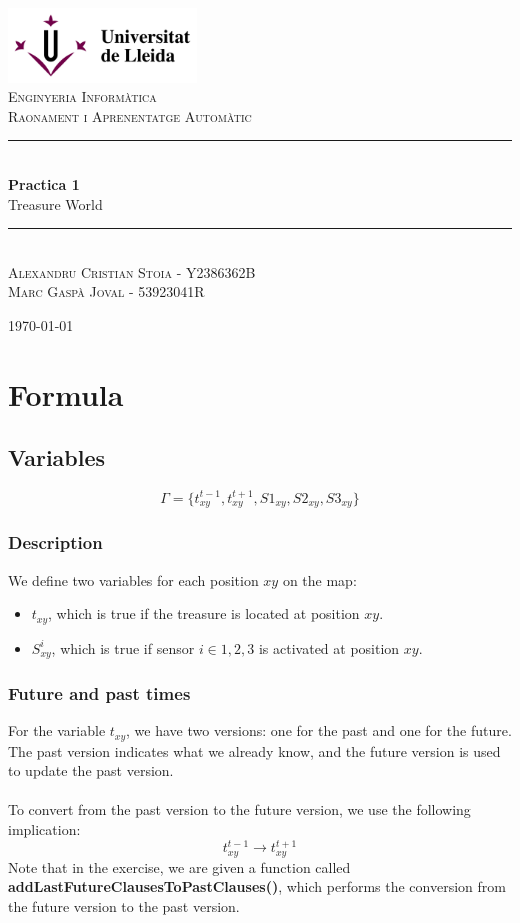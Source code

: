 \documentclass[12pt]{article}
\begin{document}
\begin{titlepage}
	\newcommand{\HRule}{\rule{\linewidth}{0.5mm}}

	\center

	\includegraphics[width=5cm]{logoudl.png}\\
	\textsc{\Large Enginyeria Informàtica}\\[0.5cm]
	\textsc{\large Raonament i Aprenentatge Automàtic}\\[0.5cm]

	\HRule\\[0.4cm]

	{\huge\bfseries Practica 1}\\[0.4cm]
	{\LARGE Treasure World}
	\HRule\\[1.5cm]

	\textsc{Alexandru Cristian Stoia - Y2386362B\\
		Marc Gaspà Joval - 53923041R}

	\vfill\vfill\vfill
	{\large\today}
\end{titlepage}
\pagebreak

\section{Formula}
\subsection{Variables}
$$ \Gamma = \{ t_{xy}^{t-1}, t_{xy}^{t+1}, S1_{xy}, S2_{xy}, S3_{xy}   \} $$

\subsubsection{Description}
We define two variables for each position $xy$ on the map:
\begin{itemize}[label={}]
	\item $t_{xy}$, which is true if the treasure is located at position $xy$.
	\item $S_{xy}^i$, which is true if sensor $i\in{1,2,3}$ is activated at position $xy$.
\end{itemize}

\subsubsection{Future and past times}
For the variable $t_{xy}$, we have two versions: one for the past and one for the future. The past version indicates what we already know, and the future version is used to update the past version.\\\\
To convert from the past version to the future version, we use the following implication:
$$ t_{xy}^{t-1} \rightarrow t_{xy}^{t+1} $$
Note that in the exercise, we are given a function called \textbf{addLastFutureClausesToPastClauses()}, which performs the conversion from the future version to the past version.
\end{document}
